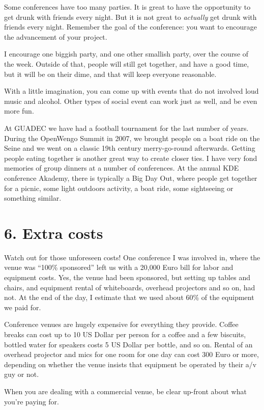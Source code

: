 Some conferences have too many parties. It is great to have the
opportunity to get drunk with friends every night. But it is not great to
\textit{actually} get drunk with friends every night. Remember the goal of the
conference: you want to encourage the advancement of your project.

I encourage one biggish party, and one other smallish party, over the
course of the week. Outside of that, people will still get together, and
have a good time, but it will be on their dime, and that will keep
everyone reasonable.

With a little imagination, you can come up with events that do not
involved loud music and alcohol. Other types of social event can work
just as well, and be even more fun.

At GUADEC we have had a football tournament for the last number of
years. During the OpenWengo Summit in 2007, we brought people on a boat
ride on the Seine and we went on a classic 19th century merry-go-round
afterwards. Getting people eating together is another great way to
create closer ties. I have very fond memories of group dinners at a
number of conferences. At the annual KDE conference Akademy, there is
typically a Big Day Out, where people get together for a picnic, some
light outdoors activity, a boat ride, some sightseeing or something similar.

\section*{6. Extra costs}

Watch out for those unforeseen costs! One conference I was involved in,
where the venue was ``100\% sponsored'' left us with a 20,000 Euro bill for
labor and equipment costs. Yes, the venue had been sponsored, but
setting up tables and chairs, and equipment rental of whiteboards,
overhead projectors and so on, had not. At the end of the day, I
estimate that we used about 60\% of the equipment we paid for.

Conference venues are hugely expensive for everything they provide.
Coffee breaks can cost up to 10 US Dollar per person for a coffee and a few
biscuits, bottled water for speakers costs 5 US Dollar per bottle, and so on.
Rental of an overhead projector and mics for one room for one day can
cost 300 Euro or more, depending on whether the venue insists that equipment
be operated by their a/v guy or not.

When you are dealing with a commercial venue, be clear up-front about
what you're paying for.

